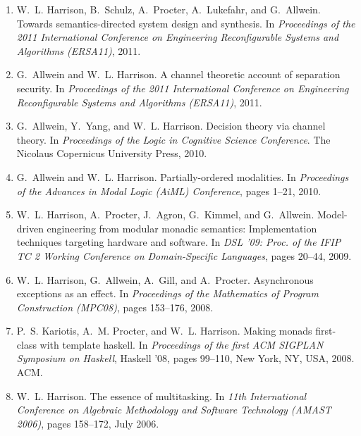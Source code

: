 \documentclass[11pt]{article}
\begin{document}
\begin{enumerate}[leftmargin=0.0mm,resume]
\item
W.~L. Harrison, B.~Schulz, A.~Procter, A.~Lukefahr, and G.~Allwein.
\newblock Towards semantics-directed system design and synthesis.
\newblock In {\em Proceedings of the 2011 International Conference on
  Engineering Reconfigurable Systems and Algorithms (ERSA11)}, 2011.



\item
G.~Allwein and W.~L. Harrison.
\newblock A channel theoretic account of separation security.
\newblock In {\em Proceedings of the 2011 International Conference on
  Engineering Reconfigurable Systems and Algorithms (ERSA11)}, 2011.


\item
G.~Allwein, Y.~Yang, and W.~L. Harrison.
\newblock Decision theory via channel theory.
\newblock In {\em Proceedings of the Logic in Cognitive Science Conference}. The Nicolaus Copernicus
  University Press, 2010.

\item
G.~Allwein and W.~L. Harrison.
\newblock Partially-ordered modalities.
\newblock In {\em Proceedings of the Advances in Modal Logic (AiML) Conference}, pages 1--21, 2010.

\item
W.~L. Harrison, A.~Procter, J.~Agron, G.~Kimmel, and G.~Allwein.
\newblock Model-driven engineering from modular monadic semantics:
  Implementation techniques targeting hardware and software.
\newblock In {\em DSL '09: Proc. of the IFIP TC 2 Working Conference on
  Domain-Specific Languages}, pages 20--44, 2009.



\item
W.~L. Harrison, G.~Allwein, A.~Gill, and A.~Procter.
\newblock Asynchronous exceptions as an effect.
\newblock In {\em Proceedings of the Mathematics of Program Construction
  (MPC08)}, pages 153--176, 2008.



\item
P.~S. Kariotis, A.~M. Procter, and W.~L. Harrison.
\newblock Making monads first-class with template haskell.
\newblock In {\em Proceedings of the first ACM SIGPLAN Symposium on Haskell},
  Haskell '08, pages 99--110, New York, NY, USA, 2008. ACM.

\item
W.~L. Harrison.
\newblock The essence of multitasking.
\newblock In {\em 11th International Conference on Algebraic Methodology and
  Software Technology {(AMAST 2006)}}, pages 158--172, July 2006.



\end{enumerate}
\end{document}
